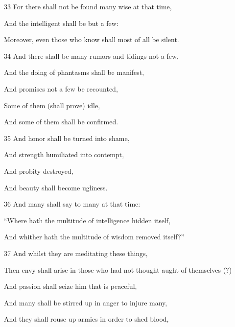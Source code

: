 \par 33 For there shall not be found many wise at that time,

\par And the intelligent shall be but a few:

\par Moreover, even those who know shall most of all be silent.

\par 34 And there shall be many rumors and tidings not a few,

\par And the doing of phantasms shall be manifest,

\par And promises not a few be recounted,

\par Some of them (shall prove) idle,

\par And some of them shall be confirmed.

\par 35 And honor shall be turned into shame,

\par And strength humiliated into contempt,

\par And probity destroyed,

\par And beauty shall become ugliness.

\par 36 And many shall say to many at that time:

\par “Where hath the multitude of intelligence hidden itself,

\par And whither hath the multitude of wisdom removed itself?”

\par 37 And whilst they are meditating these things,

\par Then envy shall arise in those who had not thought aught of themselves (?)

\par And passion shall seize him that is peaceful,

\par And many shall be stirred up in anger to injure many,

\par And they shall rouse up armies in order to shed blood,

